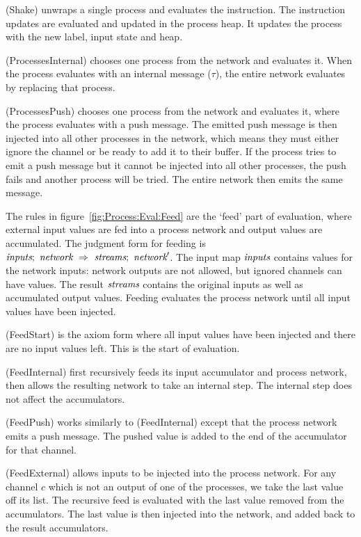 (Shake) unwraps a single process and evaluates the instruction.
The instruction updates are evaluated and updated in the process heap.
It updates the process with the new label, input state and heap.

(ProcessesInternal) chooses one process from the network and evaluates it.
When the process evaluates with an internal message ($\tau$), the entire network evaluates by replacing that process.

(ProcessesPush) chooses one process from the network and evaluates it, where the process evaluates with a push message.
The emitted push message is then injected into all other processes in the network, which means they must either ignore the channel or be ready to add it to their buffer.
If the process tries to emit a push message but it cannot be injected into all other processes, the push fails and another process will be tried.
The entire network then emits the same message.

The rules in figure~\ref{fig:Process:Eval:Feed} are the `feed' part of evaluation, where external input values are fed into a process network and output values are accumulated.
The judgment form for feeding is $\textit{inputs};~\textit{network}~\Rightarrow~\textit{streams};~\textit{network}'$.
The input map $\textit{inputs}$ contains values for the network inputs: network outputs are not allowed, but ignored channels can have values.
The result $\textit{streams}$ contains the original inputs as well as accumulated output values.
Feeding evaluates the process network until all input values have been injected.


(FeedStart) is the axiom form where all input values have been injected and there are no input values left.
This is the start of evaluation.

(FeedInternal) first recursively feeds its input accumulator and process network, then allows the resulting network to take an internal step.
The internal step does not affect the accumulators.

(FeedPush) works similarly to (FeedInternal) except that the process network emits a push message.
The pushed value is added to the end of the accumulator for that channel.

(FeedExternal) allows inputs to be injected into the process network.
For any channel $c$ which is not an output of one of the processes, we take the last value off its list.
The recursive feed is evaluated with the last value removed from the accumulators.
The last value is then injected into the network, and added back to the result accumulators.

